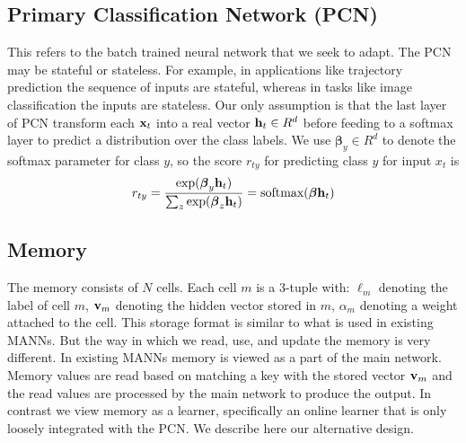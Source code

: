 \documentclass[letterpaper]{article} %
\newcommand{\vek}[1]{{\bf {#1}}}
\newcommand{\vx}{{\vek{x}}}
\newcommand{\vh}{{\vek{h}}}
\newcommand{\vM}{{\vek{v}}}
\newcommand{\util}{{\alpha}}
\newcommand{\vbeta}{{\boldsymbol{\beta}}}
\begin{document}
\subsection{Primary Classification Network (PCN)}
This refers to the batch trained neural network that we seek to adapt.
The PCN may be stateful or stateless.  For example, in applications like trajectory prediction the sequence of inputs are stateful, whereas in tasks like image classification the inputs are stateless.
Our only assumption is that the last layer of PCN transform each $\vx_t$ into a real vector $\vh_t \in R^d$ before feeding to a softmax layer to predict a distribution over the class labels.
We use $\vbeta_y \in R^d$ to denote the softmax parameter for class $y$, so the score  $r_{ty}$ for predicting class $y$ for input $x_t$ is
%
\begin{equation}
\label{eq-pcn}
\begin{split}
 r_{ty} = \frac{\exp(\vbeta_y \vh_t)}{\sum_{z}\exp(\vbeta_z \vh_t)} = \text{softmax}(\vbeta \vh_t)
 \end{split}
\end{equation}
%


\subsection{Memory}
The memory consists of $N$ cells. Each cell $m$  is a 3-tuple with:
$\ell_m$ denoting the label of cell $m$,
$\vM_m$ denoting the hidden vector stored in $m$,
$\util_m$ denoting a weight attached to the cell.  This storage format is similar to what is used in existing MANNs.  But the way in which we read, use, and update the memory is very different.  In existing MANNs memory is viewed as a part of the main network.  Memory values are read based on matching a key with the stored vector $\vM_m$ and the read values are processed by the main network to produce the output.  In contrast we view memory as a learner, specifically an online learner that is only loosely integrated with the PCN. We describe here our alternative design.
\end{document}
